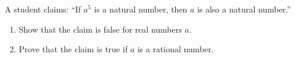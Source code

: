 A student claims: ``If $a^5$ is a natural number, then $a$ is also a natural number.''
\begin{enumerate}
\item[(a)] Show that the claim is false for real numbers $a$.
\item[(b)] Prove that the claim is true if $a$ is a rational number.
\end{enumerate}
